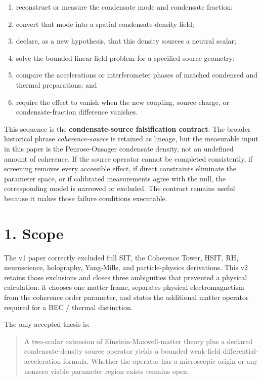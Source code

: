 \documentclass[
  american,
  11pt,
  letterpaper,
]{article}
\providecommand{\tightlist}{%
  \setlength{\itemsep}{0pt}\setlength{\parskip}{0pt}}
\begin{document}
\begin{enumerate}
\def\labelenumi{\arabic{enumi}.}
\tightlist
\item
  reconstruct or measure the condensate mode and condensate fraction;
\item
  convert that mode into a spatial condensate-density field;
\item
  declare, as a new hypothesis, that this density sources a neutral scalar;
\item
  solve the bounded linear field problem for a specified source geometry;
\item
  compare the accelerations or interferometer phases of matched condensed and thermal preparations; and
\item
  require the effect to vanish when the new coupling, source charge, or condensate-fraction difference vanishes.
\end{enumerate}

This sequence is the \textbf{condensate-source falsification contract}. The broader historical phrase \emph{coherence-source} is retained as lineage, but the measurable input in this paper is the Penrose-Onsager condensate density, not an undefined amount of coherence. If the source operator cannot be completed consistently, if screening removes every accessible effect, if direct constraints eliminate the parameter space, or if calibrated measurements agree with the null, the corresponding model is narrowed or excluded. The contract remains useful because it makes those failure conditions executable.

\section{1. Scope}\label{scope}

The v1 paper correctly excluded full SIT, the Coherence Tower, HSIT, RH, neuroscience, holography, Yang-Mills, and particle-physics derivations. This v2 retains those exclusions and closes three ambiguities that prevented a physical calculation: it chooses one matter frame, separates physical electromagnetism from the coherence order parameter, and states the additional matter operator required for a BEC / thermal distinction.

The only accepted thesis is:

\begin{quote}
A two-scalar extension of Einstein-Maxwell-matter theory plus a declared condensate-density source operator yields a bounded weak-field differential-acceleration formula. Whether the operator has a microscopic origin or any nonzero viable parameter region exists remains open.
\end{quote}
\end{document}
